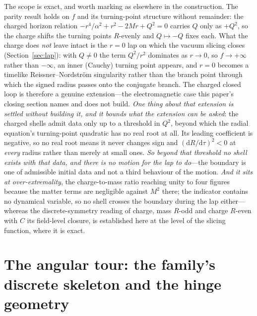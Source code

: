 \documentclass[11pt,a4paper]{article}
\theoremstyle{definition}
\newcommand{\dd}{\mathrm{d}}   %
\begin{document}
The scope is exact, and worth marking as elsewhere in the construction. The parity result holds on $f$ and its turning-point structure without remainder: the charged horizon relation $-r^{4}/\alpha^{2}+r^{2}-2Mr+Q^{2}=0$ carries $Q$ only as $+Q^{2}$, so the charge shifts the turning points $R$-evenly and $Q\mapsto-Q$ fixes each. What the charge does \emph{not} leave intact is the $r=0$ lap on which the vacuum slicing closes (Section~\ref{sec:lap}): with $Q\neq0$ the term $Q^{2}/r^{2}$ dominates as $r\to0$, so $f\to+\infty$ rather than $-\infty$, an inner (Cauchy) turning point appears, and $r=0$ becomes a timelike Reissner--Nordstr\"om singularity rather than the branch point through which the signed radius passes onto the conjugate branch. The charged closed loop is therefore a genuine extension---the electromagnetic case this paper's closing section names and does not build. \emph{One thing about that extension is settled without building it, and it bounds what the extension can be asked}: the charged shells admit data only up to a threshold in $Q^{2}$, beyond which the radial equation's turning-point quadratic has no real root at all. Its leading coefficient is negative, so no real root means it never changes sign and $(\dd R/\dd\tau)^{2}<0$ at \emph{every} radius rather than merely at small ones. \emph{So beyond that threshold no shell exists with that data, and there is no motion for the lap to do}---the boundary is one of admissible initial data and not a third behaviour of the motion. \emph{And it sits at over-extremality}, the charge-to-mass ratio reaching unity to four figures because the matter terms are negligible against $M^{2}$ there; the indicator contains no dynamical variable, so no shell crosses the boundary during the lap either---whereas the discrete-symmetry reading of charge, mass $R$-odd and charge $R$-even with $C$ its field-level closure, is established here at the level of the slicing function, where it is exact.

\section{The angular tour: the family's discrete skeleton and the hinge geometry}\label{sec:tour}
\end{document}
